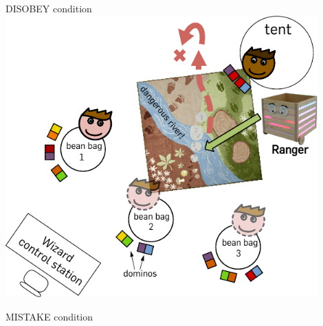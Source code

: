 \documentclass[compress]{beamer}
\begin{document}
\begin{frame}{DISOBEY condition}
        \centering
        \includegraphics[width=0.9\textwidth]{domino-setup-disobey}
\end{frame}

\begin{frame}{MISTAKE condition}

    \centering
     {
    }
\end{frame}
\end{document}
